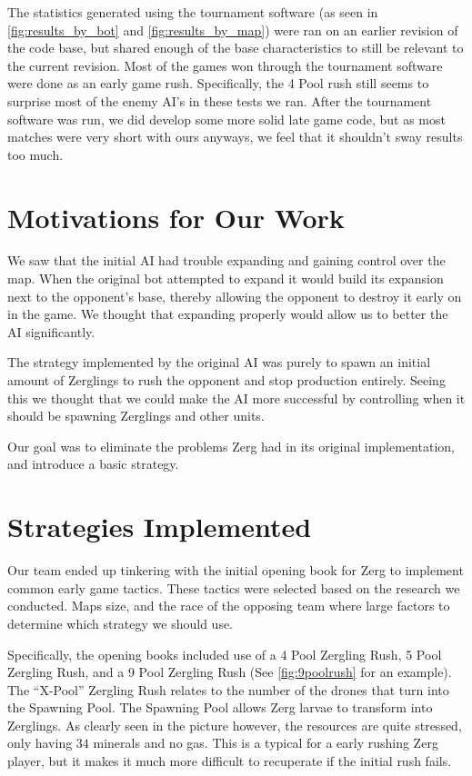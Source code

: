\documentclass{article}
\begin{document}
The statistics generated using the tournament software \cite{tournament_software} (as seen in \autoref{fig:results_by_bot} and \autoref{fig:results_by_map}) were ran on an earlier revision of the code base, but shared enough of the base characteristics to still be relevant to the current revision. Most of the games won through the tournament software were done as an early game rush. Specifically, the 4 Pool rush still seems to surprise most of the enemy AI's in these tests we ran. After the tournament software was run, we did develop some more solid late game code, but as most matches were very short with ours anyways, we feel that it shouldn't sway results too much.
\section{Motivations for Our Work}

We saw that the initial AI had trouble expanding and gaining control over the map. When the original bot attempted to expand it would build its expansion next to the opponent's base, thereby allowing the opponent to destroy it early on in the game. We thought that expanding properly would allow us to better the AI significantly.

The strategy implemented by the original AI was purely to spawn an initial amount of Zerglings to rush the opponent and stop production entirely. Seeing this we thought that we could make the AI more successful by controlling when it should be spawning Zerglings and other units. 

Our goal was to eliminate the problems Zerg had in its original implementation, and introduce a basic strategy.  

\section{Strategies Implemented}

Our team ended up tinkering with the initial opening book for Zerg to implement common early game tactics. These tactics were selected based on the research we conducted. Maps size, and the race of the opposing team where large factors to determine which strategy we should use.

Specifically, the opening books included use of a 4 Pool Zergling Rush, 5 Pool Zergling Rush, and a 9 Pool Zergling Rush (See \autoref{fig:9poolrush} for an example). The ``X-Pool'' Zergling Rush relates to the number of the drones that turn into the Spawning Pool. The Spawning Pool allows Zerg larvae to transform into Zerglings. As clearly seen in the picture however, the resources are quite stressed, only having $34$ minerals and no gas. This is a typical for a early rushing Zerg player, but it makes it much more difficult to recuperate if the initial rush fails.
\end{document}
